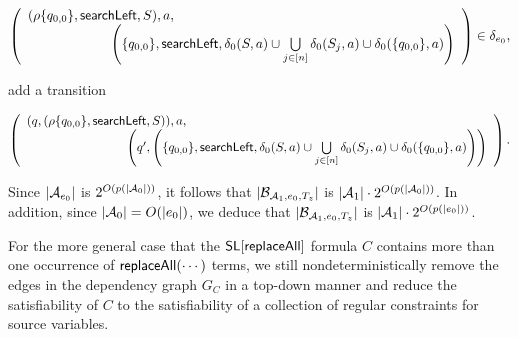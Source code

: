 \begin{enumerate}
\begin{itemize}
\medskip

		$\left(
		\begin{array}{l l}
		(\rho \{q_{0,0}\}, \searchleft, S), a, &\\
		& \hspace{-2cm} \left(\{q_{0,0}\}, \searchleft, \delta_0(S,a) \cup \bigcup \limits_{j \in [n]} \delta_0(S_j, a) \cup \delta_0(\{q_{0,0}\}, a) \right)
		\end{array}
		\right) \in \delta_{e_0},$

\medskip

add a transition

\medskip
		$\left(
		\begin{array}{l l}
		(q, (\rho \{q_{0,0}\}, \searchleft, S)), a, &\\
		& \hspace{-2cm} \left(q', \left(\{q_{0,0}\}, \searchleft, \delta_0(S,a) \cup \bigcup \limits_{j \in [n]} \delta_0(S_j, a) \cup \delta_0(\{q_{0,0}\}, a) \right)\right)
		\end{array}
		\right).$
\medskip

\end{itemize}
\end{enumerate}
Since $|\mathcal{A}_{e_0}|$ is $2^{O(p(|\mathcal{A}_0|))}$, it follows that $|\mathcal{B}_{\mathcal{A}_1, e_0, T_z}|$ is $|\mathcal{A}_1| \cdot 2^{O(p(|\mathcal{A}_0|))}$. In addition, since $|\mathcal{A}_0|=O(|e_0|)$, we deduce that $|\mathcal{B}_{\mathcal{A}_1, e_0, T_z}|$ is $|\mathcal{A}_1| \cdot 2^{O(p(|e_0|))}$.


For the more general case that the $\mathsf{SL}[\mathsf{replaceAll}]$ formula $C$ contains more than one occurrence of $\mathsf{replaceAll}(\cdots)$ terms, we still nondeterministically remove the edges in the dependency graph $G_C$ in a top-down manner and reduce the satisfiability of $C$ to the satisfiability of a collection of regular constraints for source variables. 

